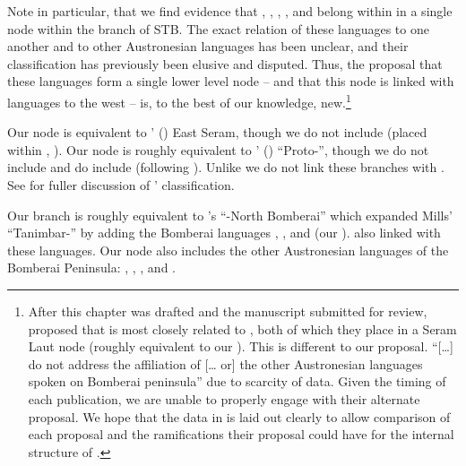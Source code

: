 Note in particular, that we find evidence that ,
, , , and  belong within in a single
 node within the  branch of STB.
The exact relation of these languages to one another
and to other Austronesian languages has been unclear,
and their classification has previously been elusive and disputed.
Thus, the proposal that these languages form a single lower level
node -- and that this node is linked with languages to the west -- is,
to the best of our knowledge,
new.\footnote{\label{fn:SchapperZobel2024}
		After this chapter was drafted
		and the manuscript submitted for review,
		\citet{SchapperZobel2024b} proposed that  is most closely
		related to , both of which they place in a Seram Laut node (roughly equivalent
		to our ).
		This is different to our proposal.
		\citet{SchapperZobel2024b} “[{\ldots}] do not address
		the affiliation of  [{\ldots} or] the other Austronesian
		languages spoken on Bomberai peninsula” due to scarcity of data.
		Given the timing of each publication,
		we are unable to properly engage with their alternate proposal.
		We hope that the data in  %
		is laid out clearly to allow comparison of each
		proposal and the ramifications their proposal could have for
		the internal structure of .}

Our  node is equivalent to
\citeauthor{Collins1986}’ (\citeyear{Collins1986})
East Seram, though we do not include 
(placed within , ).
Our  node is roughly equivalent
 to \citeauthor{Collins1986}’ (\citeyear{Collins1986})
“Proto-”, though we do not include 
and do include  (following \citealp{Zobel2014}).
Unlike \citet{Collins1986} we do not link these branches with .
See  for fuller discussion of \citeauthor{Collins1986}’ classification.

Our  branch is roughly
equivalent to \citeauthor{Blust1993}’s
\citeyear[276ff]{Blust1993} “-North Bomberai” which expanded Mills’ “Tanimbar-”
by adding the Bomberai languages ,
, and  (our ).
\citet{Blust1993} also linked  with these languages.
Our  node also includes the other Austronesian
languages of the Bomberai Peninsula: , , , and .

